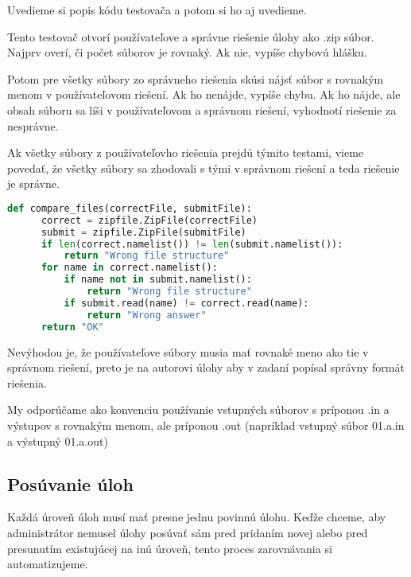 Uvedieme si popis kódu testovača a potom si ho aj uvedieme.

Tento testovač otvorí používateľove a správne riešenie úlohy ako .zip súbor.
Najprv overí, či počet súborov je rovnaký. Ak nie, vypíše chybovú hlášku.

Potom pre všetky súbory zo správneho riešenia skúsi nájsť súbor s rovnakým menom
v používateľovom riešení. Ak ho nenájde, vypíše chybu. Ak ho nájde, ale obsah súboru sa líši v
používateľovom a správnom riešení, vyhodnotí riešenie za nesprávne.

Ak všetky súbory z používateľovho riešenia prejdú týmito testami, vieme povedať,
že všetky súbory sa zhodovali s tými v správnom riešení a teda riešenie je správne.
\begin{lstlisting}[language=Python]
  def compare_files(correctFile, submitFile):
      correct = zipfile.ZipFile(correctFile)
      submit = zipfile.ZipFile(submitFile)
      if len(correct.namelist()) != len(submit.namelist()):
          return "Wrong file structure"
      for name in correct.namelist():
          if name not in submit.namelist():
              return "Wrong file structure"
          if submit.read(name) != correct.read(name):
              return "Wrong answer"
      return "OK"
\end{lstlisting}

Nevýhodou je, že používateľove súbory musia mať rovnaké meno ako tie v správnom riešení,
preto je na autorovi úlohy aby v zadaní popísal správny formát riešenia.

My odporúčame ako konvenciu používanie vstupných súborov s príponou .in a výstupov
s rovnakým menom, ale príponou .out (napríklad vstupný súbor 01.a.in a výstupný 01.a.out)

\subsection{Posúvanie úloh}
\label{implementacia:posuvanie}
Každá úroveň úloh musí mať presne jednu povinnú úlohu. Keďže chceme, aby administrátor
nemusel úlohy posúvať sám pred pridaním novej alebo pred presunutím existujúcej na inú úroveň,
tento proces zarovnávania si automatizujeme.

